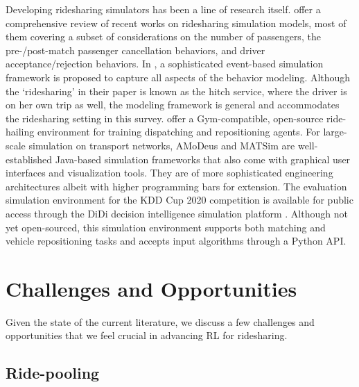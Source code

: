 \documentclass{article}
\newcommand{\tq}[1]{\textcolor{red}{#1}}
\begin{document}
Developing ridesharing simulators has been a line of research itself. \cite{yao2021ridesharing} offer a comprehensive review of recent works on ridesharing simulation models, most of them covering a subset of considerations on the number of passengers, the pre-/post-match passenger cancellation behaviors, and driver acceptance/rejection behaviors. In \citep{yao2021ridesharing}, a sophisticated event-based simulation framework is proposed to capture all aspects of the behavior modeling. Although the `ridesharing' in their paper is known as the hitch service, where the driver is on her own trip as well, the modeling framework is general and accommodates the ridesharing setting in this survey. 
\cite{chaudhari2020learn} offer a Gym-compatible, open-source ride-hailing environment \citep{learn2earn2020code} for training dispatching and repositioning agents. For large-scale simulation on transport networks, AMoDeus \citep{ruch2018amodeus} and MATSim \citep{w2016multi} are well-established Java-based simulation frameworks that also come with graphical user interfaces and visualization tools. They are of more sophisticated engineering architectures albeit with higher programming bars for extension.
The evaluation simulation environment for the KDD Cup 2020 competition is available for public access through the DiDi decision intelligence simulation platform \citep{didisim}. Although not yet open-sourced, this simulation environment supports both matching and vehicle repositioning tasks and accepts input algorithms through a Python API.




\section{Challenges and Opportunities}\label{sec:discussions}
Given the state of the current literature, we discuss a few challenges and opportunities that we feel crucial in advancing RL for ridesharing.



\subsection{Ride-pooling} 
\end{document}

